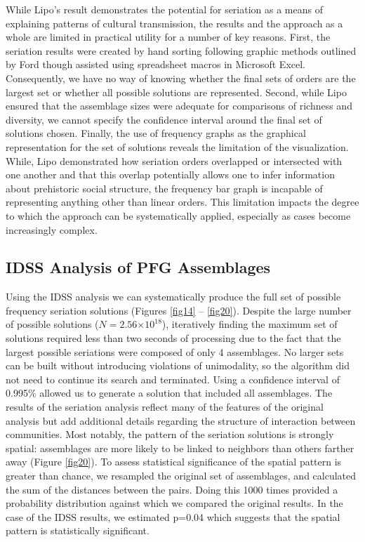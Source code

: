 \documentclass[10pt,letterpaper]{article}
\begin{document}
While Lipo’s result demonstrates the potential for seriation as a means of explaining patterns of cultural transmission, the results and the approach as a whole are limited in practical utility for a number of key reasons. First, the seriation results were created by hand sorting following graphic methods outlined by Ford \cite{Ford1949,Phillips1951} though assisted using spreadsheet macros in Microsoft Excel. Consequently, we have no way of knowing whether the final sets of orders are the largest set or whether all possible solutions are represented. Second, while Lipo ensured that the assemblage sizes were adequate for comparisons of richness and diversity, we cannot specify the confidence interval around the final set of solutions chosen. Finally, the use of frequency graphs as the graphical representation for the set of solutions reveals the limitation of the visualization.  While, Lipo demonstrated how seriation orders overlapped or intersected with one another and that this overlap potentially allows one to infer information about prehistoric social structure, the frequency bar graph is incapable of representing anything other than linear orders. This limitation impacts the degree to which the approach can be systematically applied, especially as cases become increasingly complex. 

\subsection*{IDSS Analysis of PFG Assemblages}

Using the IDSS analysis we can systematically produce the full set of possible frequency seriation solutions (Figures \ref{fig14} -- \ref{fig20}). Despite the large number of possible solutions ($N = 2.56\ensuremath{\times 10^{18}}$), iteratively finding the maximum set of solutions required less than two seconds of processing due to the fact that the largest possible seriations were composed of only 4 assemblages. No larger sets can be built without introducing violations of unimodality, so the algorithm did not need to continue its search and terminated. Using a confidence interval of 0.995\% allowed us to generate a solution that included all assemblages. 
The results of the seriation analysis reflect many of the features of the original analysis but add additional details regarding the structure of interaction between communities. Most notably, the pattern of the seriation solutions is strongly spatial: assemblages are more likely to be linked to neighbors than others farther away (Figure \ref{fig20}). To assess statistical significance of the spatial pattern is greater than chance, we resampled the original set of assemblages, and calculated the sum of the distances between the pairs. Doing this 1000 times provided a probability distribution against which we compared the original results. In the case of the IDSS results, we estimated p=0.04 which suggests that the spatial pattern is statistically significant.
\end{document}
